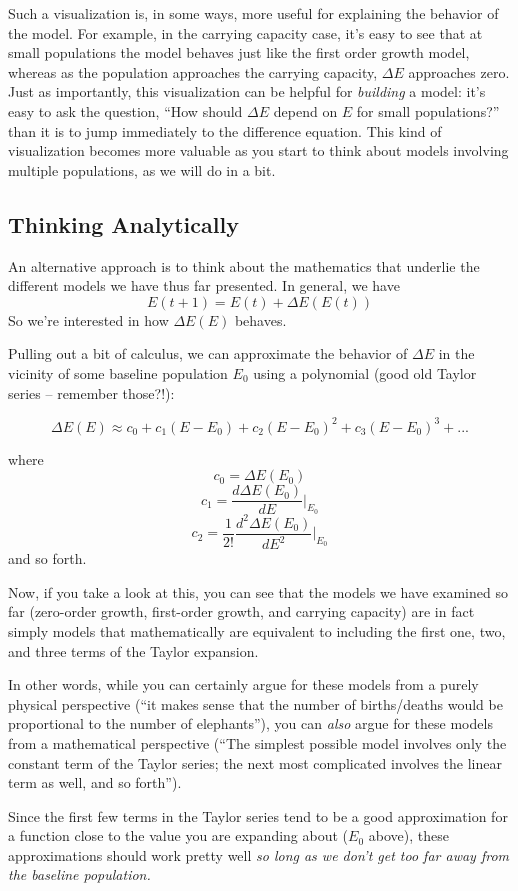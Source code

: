 Such a visualization is, in some ways, more useful for explaining the behavior of the model.  For example, in the carrying capacity case, it's easy to see that at small populations the model behaves just like the first order growth model, whereas as the population approaches the carrying capacity, $\Delta E$ approaches zero.  Just as importantly, this visualization can be helpful for {\it building} a model:  it's easy to ask the question, ``How should $\Delta E$ depend on $E$ for small populations?'' than it is to jump immediately to the difference equation.  This kind of visualization becomes more valuable as you start to think about models involving multiple populations, as we will do in a bit.

\subsection{Thinking Analytically}
An alternative approach is to think about the mathematics that underlie the different models we have thus far presented.  In general, we have
$$E(t+1) = E(t) + \Delta E(E(t))$$
So we're interested in how $\Delta E(E)$ behaves.

Pulling out a bit of calculus, we can approximate the behavior of $\Delta E$ in the vicinity of some baseline population $E_0$ using a polynomial (good old Taylor series -- remember those?!):

$$\Delta E(E) \approx c_0 + c_1(E-E_0) + c_2 (E-E_0)^2 + c_3 (E-E_0)^3 + ...$$

where $$c_0 = \Delta E(E_0)$$
 $$c_1 = \frac{d \Delta E(E_0)}{dE} |_{E_0}$$
$$c_2 = \frac{1}{2!}\frac{d^2 \Delta E(E_0)}{dE^2} |_{E_0}$$
 and so forth.

Now, if you take a look at this, you can see that the models we have examined so far (zero-order growth, first-order growth,  and carrying capacity) are in fact simply models that mathematically are equivalent to including the first one, two, and three terms of the Taylor expansion.

In other words, while you can certainly argue for these models from a purely physical perspective (``it makes sense that the number of births/deaths would be proportional to the number of elephants''), you can {\it also} argue for these models from a mathematical perspective (``The simplest possible model involves only the constant term of the Taylor series; the next most complicated involves the linear term as well, and so forth'').  

Since the first few terms in the Taylor series tend to be a good approximation for a function close to the value you are expanding about ($E_0$ above), these approximations should work pretty well {\it so long as we don't get too far away from the baseline population.}  

